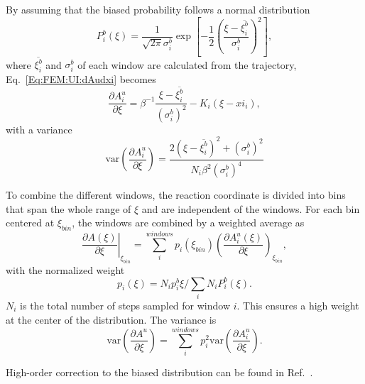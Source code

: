 By assuming that the biased probability follows a normal distribution
\begin{equation}
    P_i^b(\xi)=\frac{1}{\sqrt{2\pi}\sigma_i^b}\exp{\left[-\frac{1}{2}\left(\frac{\xi-\overline{\xi_i^b}}{\sigma_i^b}\right)^2\right]},
\end{equation}
where $\overline{\xi_i^b}$ and $\sigma_i^b$ of each window are calculated from the trajectory, Eq.~\ref{Eq:FEM:UI:dAudxi} becomes
\begin{equation}
    \frac{\partial A_i^u}{\partial \xi}=\beta^{-1}\frac{\xi-\overline{\xi_i^b}}{(\sigma_i^b)^2}-K_i(\xi-xi_i),
\end{equation}
with a variance\cite{KaestnerJCP2006}
\begin{equation}
    \mathrm{var}\left(\frac{\partial A_i^u}{\partial \xi}\right)=\frac{2(\xi-\overline{\xi_i^b})^2+(\sigma_i^b)^2}{N_i\beta^2(\sigma_i^b)^4}
\end{equation}

To combine the different windows, the reaction coordinate is divided into bins that span the whole range of $\xi$ and are independent of the windows. For each bin centered at $\xi_{bin}$, the windows are combined by a weighted average as
\begin{equation}
    \left.\frac{\partial A(\xi)}{\partial \xi}\right\vert_{\xi_{bin}}=\sum_{i}^{windows}p_i(\xi_{bin})\left(\frac{\partial A_i^u(\xi)}{\partial \xi}\right)_{\xi_{bin}},
\end{equation}
with the normalized weight
\begin{equation}
    p_i(\xi)=N_ip_i^b{\xi}/\sum_i N_iP_i^b(\xi).
\end{equation}
$N_i$ is the total number of steps sampled for window $i$. This ensures a high weight at the center of the distribution. The variance is
\begin{equation}
    \mathrm{var}\left(\frac{\partial A^u}{\partial \xi}\right)=\sum_{i}^{windows}p_i^2\mathrm{var}\left(\frac{\partial A_i^u}{\partial \xi}\right).
\end{equation}

High-order correction to the biased distribution can be found in Ref.~\cite{KaestnerJCP2012}.